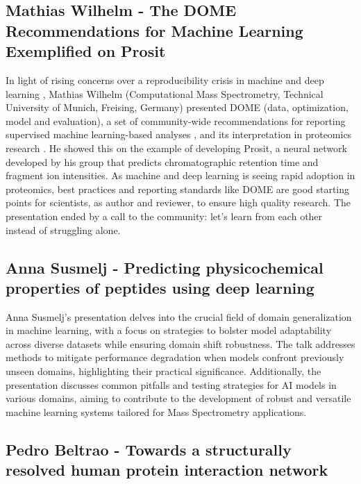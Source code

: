\subsection{Mathias Wilhelm - The DOME Recommendations for Machine Learning Exemplified on Prosit}

In light of rising concerns over a reproducibility crisis in machine and deep learning \citep{pmid35883008}, Mathias Wilhelm (Computational Mass Spectrometry, Technical University of Munich, Freising, Germany) presented DOME (data, optimization, model and evaluation), a set of community-wide recommendations for reporting supervised machine learning-based analyses \citep{pmid34316068}, and its interpretation in proteomics research \citep{pmid35119864}. He showed this on the example of developing Prosit, a neural network developed by his group that predicts chromatographic retention time and fragment ion intensities. As machine and deep learning is seeing rapid adoption in proteomics, best practices and reporting standards like DOME are good starting points for scientists, as author and reviewer, to ensure high quality research. The presentation ended by a call to the community: let's learn from each other instead of struggling alone.

\subsection{Anna Susmelj - Predicting physicochemical properties of peptides using deep learning}

Anna Susmelj’s presentation delves into the crucial field of domain generalization in machine learning, with a focus on strategies to bolster model adaptability across diverse datasets while ensuring domain shift robustness. The talk addresses methods to mitigate performance degradation when models confront previously unseen domains, highlighting their practical significance. Additionally, the presentation discusses common pitfalls and testing strategies for AI models in various domains, aiming to contribute to the development of robust and versatile machine learning systems tailored for Mass Spectrometry applications.


\subsection{Pedro Beltrao - Towards a structurally resolved human protein interaction network}

